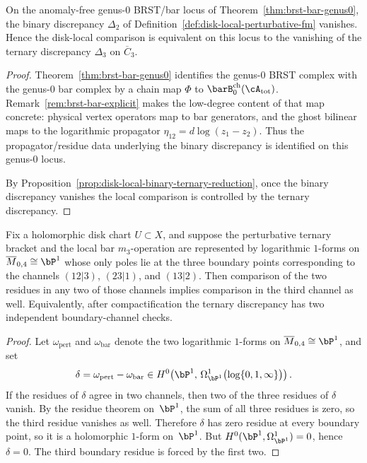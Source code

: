 \begin{corollary}
\label{cor:disk-local-ternary-on-brstbar-locus}
On the anomaly-free genus-$0$ BRST/bar locus of
Theorem~\ref{thm:brst-bar-genus0}, the binary discrepancy
\(\Delta_2\) of Definition~\ref{def:disk-local-perturbative-fm}
vanishes.  Hence the disk-local comparison is equivalent on this locus
to the vanishing of the ternary discrepancy \(\Delta_3\) on
\(\overline{C}_3\).
\end{corollary}

\begin{proof}
Theorem~\ref{thm:brst-bar-genus0} identifies the genus-$0$ BRST complex
with the genus-$0$ bar complex by a chain map
\(\Phi\) to \(\barB^{\mathrm{ch}}_0(\cA_{\mathrm{tot}})\).
Remark~\ref{rem:brst-bar-explicit} makes the low-degree content of that
map concrete: physical vertex operators map to bar generators, and the
ghost bilinear maps to the logarithmic propagator
\(\eta_{12}=d\log(z_1-z_2)\).
Thus the propagator/residue data underlying the binary discrepancy is
identified on this genus-$0$ locus.

By Proposition~\ref{prop:disk-local-binary-ternary-reduction}, once the
binary discrepancy vanishes the local comparison is controlled by the
ternary discrepancy.
\end{proof}

\begin{proposition}
\label{prop:compactified-ternary-two-channel}
Fix a holomorphic disk chart $U \subset X$, and suppose the
perturbative ternary bracket and the local bar $m_3$-operation are
represented by logarithmic $1$-forms on
$\overline{M}_{0,4} \cong \bP^1$ whose only poles lie at the three
boundary points corresponding to the channels
$(12|3)$, $(23|1)$, and $(13|2)$.
Then comparison of the two residues in any two of those channels
implies comparison in the third channel as well.
Equivalently, after compactification the ternary discrepancy has two
independent boundary-channel checks.
\end{proposition}

\begin{proof}
Let $\omega_{\mathrm{pert}}$ and $\omega_{\mathrm{bar}}$ denote the two
logarithmic $1$-forms on $\overline{M}_{0,4} \cong \bP^1$, and set
\[
\delta = \omega_{\mathrm{pert}} - \omega_{\mathrm{bar}}
\in H^0\!\left(\bP^1,\,
\Omega^1_{\bP^1}\bigl(\log\{0,1,\infty\}\bigr)\right).
\]
If the residues of $\delta$ agree in two channels, then two of the
three residues of $\delta$ vanish. By the residue theorem on~$\bP^1$,
the sum of all three residues is zero, so the third residue vanishes as
well. Therefore $\delta$ has zero residue at every boundary point, so
it is a holomorphic $1$-form on~$\bP^1$. But
$H^0(\bP^1,\Omega^1_{\bP^1}) = 0$, hence $\delta = 0$.
The third boundary residue is forced by the first two.
\end{proof}


